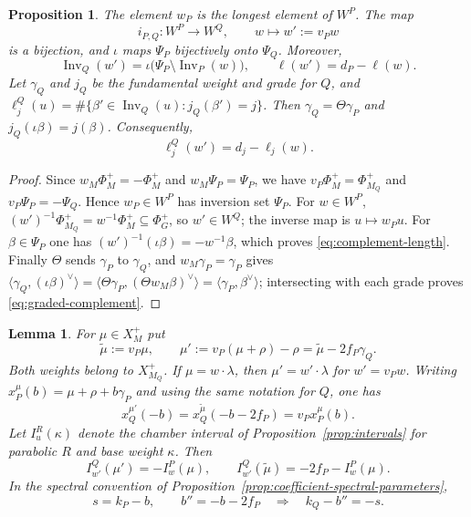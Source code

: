 \documentclass[12pt]{amsart}
\numberwithin{equation}{section}
\theoremstyle{plain}
\newtheorem{lemma}[theorem]{Lemma}
\newtheorem{proposition}[theorem]{Proposition}
\theoremstyle{definition}
\theoremstyle{remark}
\DeclareMathOperator{\Inv}{Inv}
\begin{document}
\begin{proposition}\label{prop:associate-complement}
The element $w_P$ is the longest element of $W^P$. The map
\[
 i_{P,Q}:W^P\longrightarrow W^Q,\qquad w\longmapsto w':=v_Pw
\]
is a bijection, and $\iota$ maps $\Psi_P$ bijectively onto $\Psi_Q$. Moreover,
\begin{equation}\label{eq:complement-length}
 \Inv_Q(w')=\iota\bigl(\Psi_P\setminus\Inv_P(w)\bigr),
 \qquad \ell(w')=d_P-\ell(w).
\end{equation}
Let $\gamma_Q$ and $j_Q$ be the fundamental weight and grade for $Q$, and $\ell_j^Q(u)=\#\{\beta'\in\Inv_Q(u):j_Q(\beta')=j\}$. Then $\gamma_Q=\Theta\gamma_P$ and
$j_Q(\iota\beta)=j(\beta)$. Consequently,
\begin{equation}\label{eq:graded-complement}
 \ell_j^Q(w')=d_j-\ell_j(w).
\end{equation}
\end{proposition}

\begin{proof}
Since $w_M\Phi_M^+=-\Phi_M^+$ and $w_M\Psi_P=\Psi_P$, we have $v_P\Phi_M^+=\Phi_{M_Q}^+$ and $v_P\Psi_P=-\Psi_Q$. Hence $w_P\in W^P$ has inversion set $\Psi_P$. For $w\in W^P$,
$(w')^{-1}\Phi_{M_Q}^+=w^{-1}\Phi_M^+\subseteq\Phi_G^+$, so $w'\in W^Q$; the inverse map is $u\mapsto w_Pu$. For $\beta\in\Psi_P$ one has $(w')^{-1}(\iota\beta)=-w^{-1}\beta$, which proves \eqref{eq:complement-length}. Finally $\Theta$ sends $\gamma_P$ to $\gamma_Q$, and $w_M\gamma_P=\gamma_P$ gives $\langle\gamma_Q,(\iota\beta)^\vee\rangle
 =\langle\Theta\gamma_P,(\Theta w_M\beta)^\vee\rangle =\langle\gamma_P, \beta^\vee\rangle$; intersecting with each grade proves \eqref{eq:graded-complement}.
\end{proof}

\begin{lemma} \label{lem:associate-coefficient-line}
For $\mu\in X_M^+$ put
\[
 \widetilde\mu:=v_P\mu,\qquad
 \mu':=v_P(\mu+\rho)-\rho
      =\widetilde\mu-2f_P\gamma_Q.
\]
Both weights belong to $X_{M_Q}^+$. If $\mu=w\cdot\lambda$, then $\mu'=w'\cdot\lambda$ for $w'=v_Pw$. Writing $x_P^\mu(b)=\mu+\rho+b\gamma_P$ and using the same notation for $Q$, one has 
\begin{equation}\label{eq:associate-lines}
 x_Q^{\mu'}(-b)
 =x_Q^{\widetilde\mu}(-b-2f_P)
 =v_Px_P^\mu(b).
\end{equation}
Let $I_u^R(\kappa)$ denote the chamber interval of Proposition~\ref{prop:intervals} for parabolic $R$ and base weight $\kappa$. Then
\begin{equation}\label{eq:associate-intervals}
 I_{w'}^Q(\mu')=-I_w^P(\mu),\qquad
 I_{w'}^Q(\widetilde\mu)=-2f_P-I_w^P(\mu).
\end{equation}
In the spectral convention of Proposition~\ref{prop:coefficient-spectral-parameters},
\[
 s=k_P-b,\qquad b''=-b-2f_P
 \quad\Longrightarrow\quad k_Q-b''=-s.
\]
\end{lemma}
\end{document}
